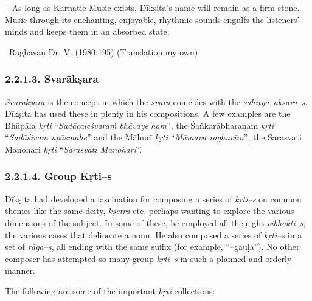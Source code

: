 \begin{myquote}
– As long as Karnatic Music exists, Dīkṣita’s name will remain as a firm stone. Music through its enchanting, enjoyable, rhythmic sounds engulfs the listeners’ minds and keeps them in an absorbed state.
\end{myquote}


~\hfill Raghavan Dr. V. (1980:195) (Translation my own)


\subsubsection*{2.2.1.3. Svarākṣara}

\textit{Svarākṣara} is the concept in which the \textit{svara} coincides with the \textit{sāhitya–akṣara–s}. Dīkṣita has used these in plenty in his compositions. A few examples are the Bhūpāla \textit{kṛti} “\textit{Sadācaleśvaraṁ bhāvaye’ham}”, the Śaṅkarābharaṇam \textit{kṛti} “\textit{Sadāśivam upāsmahe}” and the Māhurī \textit{kṛti} “\textit{Māmava raghuvīra}”, the Sarasvati Manohari \textit{kṛti} “\textit{Sarasvati Manohari”.}


\subsubsection*{2.2.1.4. Group Kṛti–s}

Dīkṣita had developed a fascination for composing a series of \textit{kṛti–s} on common themes like the same deity, \textit{kṣetra} etc, perhaps wanting to explore the various dimensions of the subject. In some of these, he employed all the eight \textit{vibhakti–s}, the various cases that delineate a noun. He also composed a series of \textit{kṛti–s} in a set of \textit{rāga–s}, all ending with the same suffix (for example, “–gauḷa”). No other composer has attempted so many group \textit{kṛti–s} in such a planned and orderly manner.

The following are some of the important \textit{kṛti} collections:

